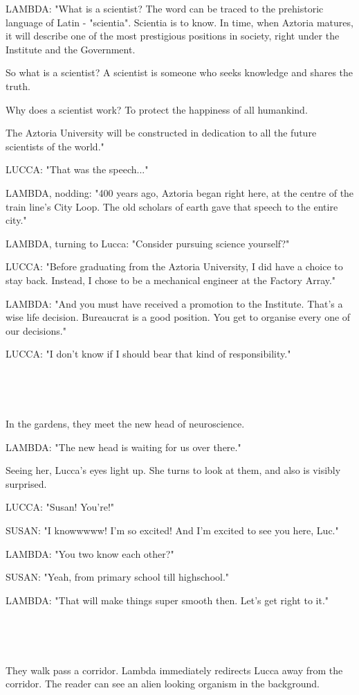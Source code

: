 \documentclass[11pt]{article}
\begin{document}
LAMBDA: "What is a scientist? 
The word can be traced to the prehistoric language of Latin - "scientia". 
Scientia is to know. 
In time, when Aztoria matures, it will describe one of the most prestigious positions in society, right under the Institute and the Government. 

So what is a scientist? 
A scientist is someone who seeks knowledge and shares the truth. 

Why does a scientist work?
To protect the happiness of all humankind.

The Aztoria University will be constructed in dedication to all the future scientists of the world."

LUCCA: "That was the speech..."

LAMBDA, nodding: "400 years ago, Aztoria began right here, at the centre of the train line's City Loop. 
The old scholars of earth gave that speech to the entire city."

LAMBDA, turning to Lucca: "Consider pursuing science yourself?"

LUCCA: "Before graduating from the Aztoria University, I did have a choice to stay back. 
Instead, I chose to be a mechanical engineer at the Factory Array."

LAMBDA: "And you must have received a promotion to the Institute.
That's a wise life decision.
Bureaucrat is a good position.
You get to organise every one of our decisions."

LUCCA: "I don't know if I should bear that kind of responsibility."

\ 

\ 

In the gardens, they meet the new head of neuroscience.

LAMBDA: "The new head is waiting for us over there."

Seeing her, Lucca's eyes light up.
She turns to look at them, and also is visibly surprised.

LUCCA: "Susan! You're!"

SUSAN: "I knowwwww! I'm so excited! And I'm excited to see you here, Luc."

LAMBDA: "You two know each other?"

SUSAN: "Yeah, from primary school till highschool."

LAMBDA: "That will make things super smooth then. Let's get right to it."

\ 

\ 

They walk pass a corridor.
Lambda immediately redirects Lucca away from the corridor.
The reader can see an alien looking organism in the background.
\end{document}
